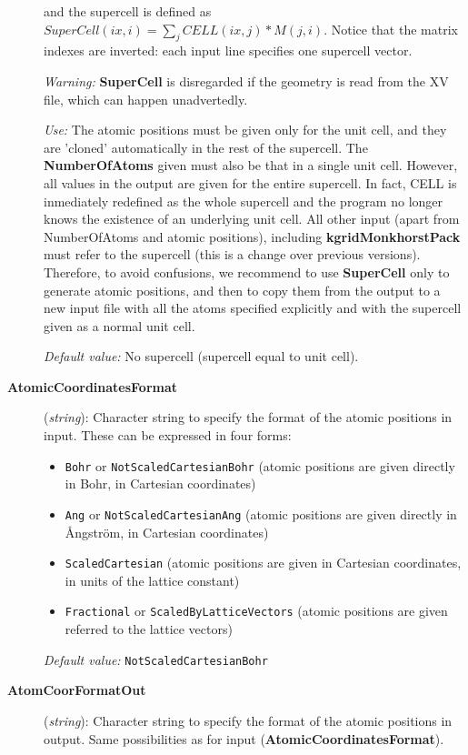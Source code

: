 \documentclass[11pt]{article}
\begin{document}
\begin{description}
and the supercell is defined as
$SuperCell(ix,i) = \sum_j CELL(ix,j)*M(j,i)$.
Notice that the matrix indexes are inverted: each input line 
specifies one supercell vector.

{\it Warning:} {\bf SuperCell} is disregarded if the geometry is read
from
the XV file, which can happen unadvertedly.

{\it Use:} The atomic positions must be given only for the unit cell,
and they are 'cloned' automatically in the rest of the supercell.
The {\bf NumberOfAtoms} given must also be that in a single unit cell.
However, all values in the output are given for the entire supercell. 
In fact, CELL is inmediately redefined as the whole supercell and the 
program no longer knows the existence of an underlying unit cell.
All other input (apart from NumberOfAtoms and atomic positions), 
including {\bf kgridMonkhorstPack} must refer to the supercell 
(this is a change over previous versions). Therefore, to avoid
confusions, we recommend to use {\bf SuperCell} only to
generate atomic positions, and then to copy them from the output
to a new input file with all the atoms specified explicitly and
with the supercell given as a normal unit cell.

{\it Default value:} No supercell (supercell equal to unit cell).


\item[{\bf AtomicCoordinatesFormat}] ({\it string}):
Character string to specify the format of the atomic positions in
input. These can be expressed in four forms:
\begin{itemize}
\item {\tt Bohr} or {\tt NotScaledCartesianBohr} (atomic positions
are given directly in Bohr, in Cartesian coordinates)
\item {\tt Ang} or {\tt NotScaledCartesianAng} (atomic positions
are given directly in {\AA}ngstr\"om, in Cartesian coordinates)
\item {\tt ScaledCartesian} (atomic positions are given
in Cartesian coordinates, in units of the lattice constant)
\item {\tt Fractional} or {\tt ScaledByLatticeVectors} (atomic positions
are given referred to the lattice vectors)
\end{itemize}

{\it Default value:} {\tt NotScaledCartesianBohr}


\item[{\bf AtomCoorFormatOut}] ({\it string}):
Character string to specify the format of the atomic positions in output.
Same possibilities as for input ({\bf AtomicCoordinatesFormat}).


\end{description}
\end{document}
